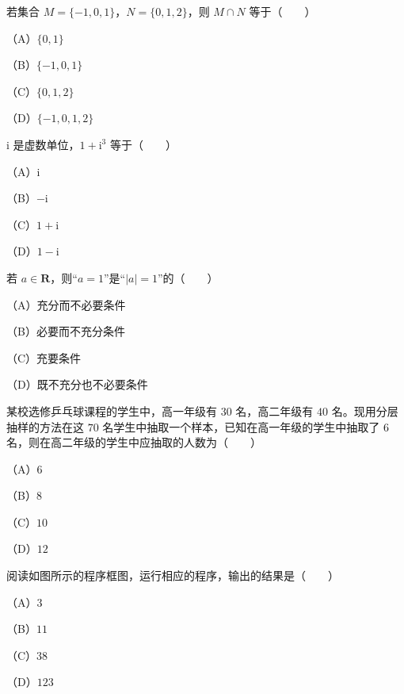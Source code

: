 

\begin{question}
若集合 $M=\{-1,0,1\}$，$N=\{0,1,2\}$，则 $M\cap N$ 等于\mbox{（　　）}

（A）$\{0,1\}$

（B）$\{-1,0,1\}$

（C）$\{0,1,2\}$

（D）$\{-1,0,1,2\}$

\end{question}
\begin{question}
$\mathrm i$ 是虚数单位，$1+\mathrm i^3$ 等于\mbox{（　　）}

（A）$\mathrm i$

（B）$-\mathrm i$

（C）$1+\mathrm i$

（D）$1-\mathrm i$

\end{question}
\begin{question}
若 $a\in\mathbf R$，则“$a=1$”是“$|a|=1$”的\mbox{（　　）}

（A）充分而不必要条件

（B）必要而不充分条件

（C）充要条件

（D）既不充分也不必要条件

\end{question}
\begin{question}
某校选修乒乓球课程的学生中，高一年级有 $30$ 名，高二年级有 $40$ 名。现用分层抽样的方法在这 $70$ 名学生中抽取一个样本，已知在高一年级的学生中抽取了 $6$ 名，则在高二年级的学生中应抽取的人数为\mbox{（　　）}

（A）$6$

（B）$8$

（C）$10$

（D）$12$

\Needspace{0.4\textheight}
\end{question}
\begin{question}
阅读如图所示的程序框图，运行相应的程序，输出的结果是\mbox{（　　）}

（A）$3$

（B）$11$

（C）$38$

（D）$123$
\nopagebreak[4]
\begin{center}\end{center}
\nopagebreak[4]
\end{question}
